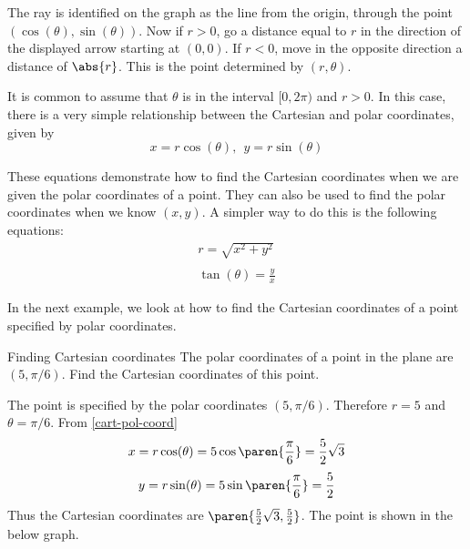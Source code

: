 The ray is identified on the graph as the line from the origin, through the point $(\cos(\theta),\sin(\theta))$. Now if $r>0$, go a distance
equal to $r$ in the direction of the displayed arrow starting at $(0,0)$. If 
$r<0$, move in the opposite direction a distance of $\abs{r}
$. This is the point determined by $(r,\theta)$.

It is common to assume that $\theta $ is in the interval $
[0,2\pi )$ and $r>0$. In this case, there is a very simple relationship
between the Cartesian and polar coordinates, given by
\begin{equation}
x=r\cos (\theta) ,\ \ y=r\sin (\theta) 
\label{cart-pol-coord}
\end{equation}

These equations demonstrate how to find the Cartesian coordinates when we are given the polar coordinates of a point. They can also be used to find the polar coordinates when we know $(x, y)$. A simpler way to do this is the following equations:
\begin{equation}
\begin{array}{l}
r = \sqrt{x^2 + y^2} \\
\\
\tan (\theta) = \frac{y}{x}
\end{array}
\label{pol-cart-coord}
\end{equation}

In the next example, we look at how to find the Cartesian coordinates of a point specified by polar coordinates. 

\begin{example}{Finding Cartesian coordinates}{}
The polar coordinates of a point in the plane are $(5,\pi /6)$.
Find the Cartesian coordinates of this point.
\end{example}

\begin{solution}
The point is specified by the polar coordinates $(5,\pi /6)$. Therefore $r=5$ and $\theta = \pi /6$. 
From {\eqref{cart-pol-coord}}
\[
x= r \cos (\theta)= 5\cos \paren{\vspace{0.05in}\frac{\pi }{6}} = \vspace{0.05in}\frac{5}{2}\sqrt{3}
\]
\[
y= r \sin (\theta) = 5\sin \paren{\vspace{0.05in}\frac{\pi }{6}} = \vspace{0.05in}\frac{5}{2}
\]
Thus the Cartesian coordinates are $\paren{\vspace{0.05in}\frac{5}{2}\sqrt{3}, \vspace{0.05in}\frac{5}{2}}$. The point is shown in the below graph. 

\begin{center}
\end{center}
\end{solution}

